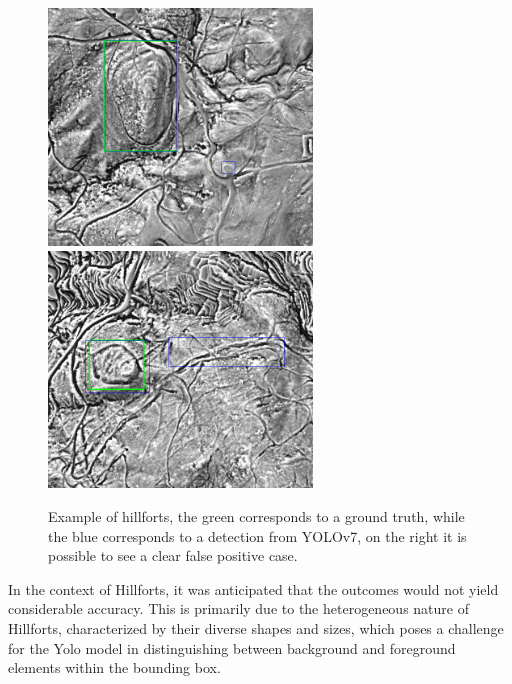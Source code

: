\begin{figure}[H]
    \centering
    {{\includegraphics[width=7cm]{images/examples_inference/yolov7/castros/1.png} }}
    \qquad
  {{\includegraphics[width=7cm]{images/examples_inference/yolov7/castros/2.png} }}
    \caption{Example of hillforts, the green corresponds to a ground truth, while the blue corresponds to a detection from YOLOv7, on the right it is possible to see a clear false positive case.}
    \label{fig:example}
\end{figure}

In the context of Hillforts, it was anticipated that the outcomes would not yield considerable accuracy. This is primarily due to the heterogeneous nature of Hillforts, characterized by their diverse shapes and sizes, which poses a challenge for the Yolo model in distinguishing between background and foreground elements within the bounding box.